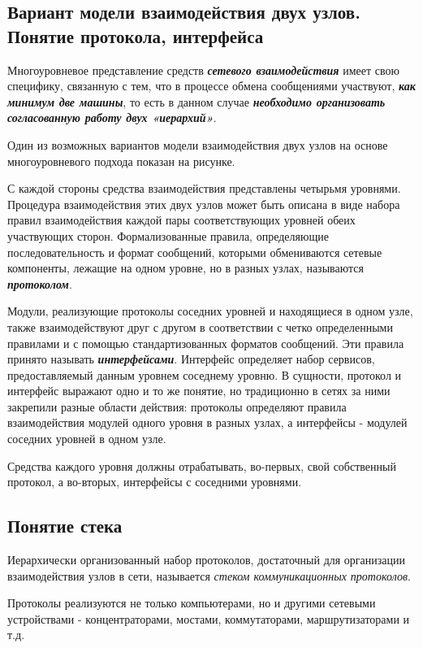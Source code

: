 \subsection{Вариант модели взаимодействия двух узлов. Понятие протокола, интерфейса}

Многоуровневое представление средств \textbf{\textit{сетевого взаимодействия}} имеет свою специфику, связанную с тем, что в процессе обмена сообщениями участвуют, \textbf{\textit{как минимум две машины}}, то есть в данном случае \textbf{\textit{необходимо организовать согласованную работу двух «иерархий»}}.

Один из возможных вариантов модели взаимодействия двух узлов на основе многоуровневого подхода показан на рисунке.

С каждой стороны средства взаимодействия представлены четырьмя уровнями.
Процедура взаимодействия этих двух узлов может быть описана в виде набора правил взаимодействия каждой пары соответствующих уровней обеих участвующих сторон.
Формализованные правила, определяющие последовательность и формат сообщений, которыми обмениваются сетевые компоненты, лежащие на одном уровне, но в разных узлах, называются \textbf{\textit{протоколом}}.

Модули, реализующие протоколы соседних уровней и находящиеся в одном узле, также взаимодействуют друг с другом в соответствии с четко определенными правилами и с помощью стандартизованных форматов сообщений.
Эти правила принято называть \textbf{\textit{интерфейсами}}.
Интерфейс определяет набор сервисов, предоставляемый данным уровнем соседнему уровню.
В сущности, протокол и интерфейс выражают одно и то же понятие, но традиционно в сетях за ними закрепили разные области действия: протоколы определяют правила взаимодействия модулей одного уровня в разных узлах, а интерфейсы - модулей соседних уровней в одном узле.

Средства каждого уровня должны отрабатывать, во-первых, свой собственный протокол, а во-вторых, интерфейсы с соседними уровнями.

\subsection{Понятие стека}

Иерархически организованный набор протоколов, достаточный для организации взаимодействия узлов в сети, называется \emph{стеком коммуникационных протоколов}.

Протоколы реализуются не только компьютерами, но и другими сетевыми устройствами - концентраторами, мостами, коммутаторами, маршрутизаторами и т.д.

